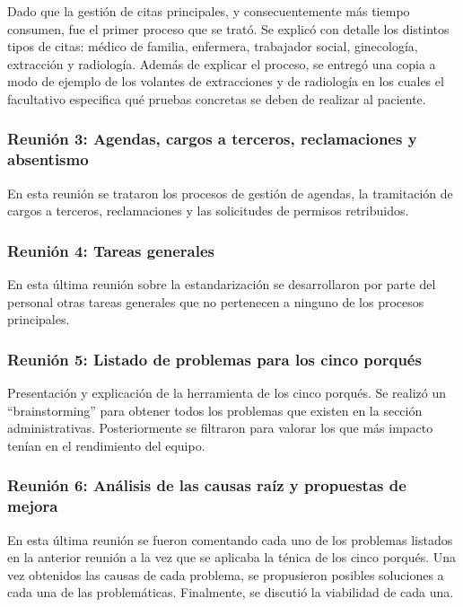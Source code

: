 Dado que la gestión de citas principales, y consecuentemente más tiempo consumen, fue el primer proceso que se trató. Se explicó con detalle los distintos tipos de citas: médico de familia, enfermera, trabajador social, ginecología, extracción y radiología. Además de explicar el proceso, se entregó una copia a modo de ejemplo de los volantes de extracciones y de radiología en los cuales el facultativo especifica qué pruebas concretas se deben de realizar al paciente.

\subsubsection{Reunión 3: Agendas, cargos a terceros, reclamaciones y absentismo}

En esta reunión se trataron los procesos de gestión de agendas, la tramitación de cargos a terceros, reclamaciones y las solicitudes de permisos retribuidos.

\subsubsection{Reunión 4: Tareas generales}

En esta última reunión sobre la estandarización se desarrollaron por parte del personal otras tareas generales que no pertenecen a ninguno de los procesos principales.

\subsubsection{Reunión 5: Listado de problemas para los cinco porqués}

Presentación y explicación de la herramienta de los cinco porqués.
Se realizó un ``brainstorming'' para obtener todos los problemas que existen en la sección administrativas.
Posteriormente se filtraron para valorar los que más impacto tenían en el rendimiento del equipo.

\subsubsection{Reunión 6: Análisis de las causas raíz y propuestas de mejora}

En esta última reunión se fueron comentando cada uno de los problemas listados en la anterior reunión a la vez que se aplicaba la ténica de los cinco porqués.
Una vez obtenidos las causas de cada problema, se propusieron posibles soluciones a cada una de las problemáticas.
Finalmente, se discutió la viabilidad de cada una.

